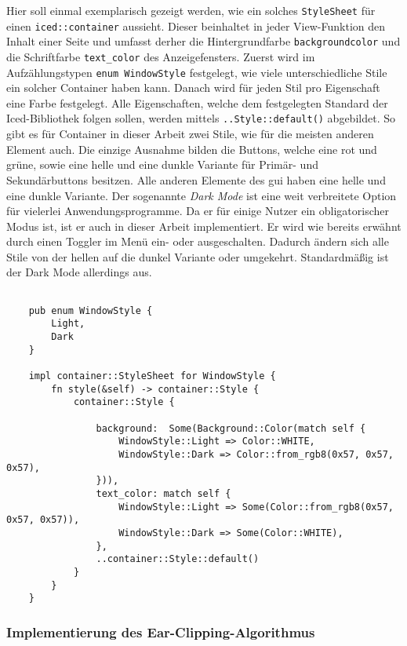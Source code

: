 Hier soll einmal exemplarisch gezeigt werden, wie ein solches \lstinline{StyleSheet} für einen \lstinline{iced::container} aussieht. Dieser beinhaltet in jeder View-Funktion den Inhalt einer Seite 
und umfasst derher die Hintergrundfarbe \lstinline{backgroundcolor} und die Schriftfarbe \lstinline{text_color} des Anzeigefensters. 
Zuerst wird im Aufzählungstypen \lstinline{enum WindowStyle} festgelegt, wie viele unterschiedliche Stile ein solcher Container haben kann. 
Danach wird für jeden Stil pro Eigenschaft eine Farbe festgelegt. Alle Eigenschaften, welche dem festgelegten Standard der Iced-Bibliothek folgen sollen, werden mittels 
\lstinline{..Style::default()} abgebildet. So gibt es für Container in dieser Arbeit zwei Stile, wie für die meisten anderen Element auch. Die einzige Ausnahme bilden die Buttons, welche eine rot und grüne, 
sowie eine helle und eine dunkle Variante für Primär- und Sekundärbuttons besitzen. 
Alle anderen Elemente des \ac{gui} haben eine helle und eine dunkle Variante. Der sogenannte \emph{Dark Mode} ist eine weit verbreitete Option für vielerlei Anwendungsprogramme. Da er für einige Nutzer ein obligatorischer Modus ist,
ist er auch in dieser Arbeit implementiert. Er wird wie bereits erwähnt durch einen Toggler im Menü ein- oder ausgeschalten. Dadurch ändern sich alle Stile von der hellen auf die dunkel Variante oder umgekehrt. 
Standardmäßig ist der Dark Mode allerdings aus.

\begin{lstlisting}
  
    pub enum WindowStyle {
        Light,
        Dark
    }

    impl container::StyleSheet for WindowStyle {
        fn style(&self) -> container::Style {
            container::Style { 
                
                background:  Some(Background::Color(match self {
                    WindowStyle::Light => Color::WHITE,
                    WindowStyle::Dark => Color::from_rgb8(0x57, 0x57, 0x57),
                })),
                text_color: match self {
                    WindowStyle::Light => Some(Color::from_rgb8(0x57, 0x57, 0x57)),
                    WindowStyle::Dark => Some(Color::WHITE),
                },
                ..container::Style::default()
            }
        }
    }

\end{lstlisting}

\subsubsection{Implementierung des Ear-Clipping-Algorithmus}

